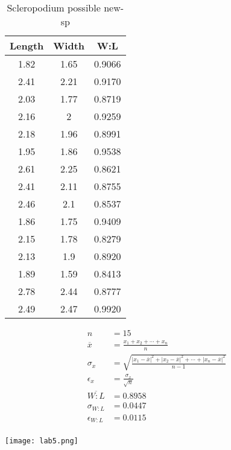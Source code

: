 \documentclass{article}
\begin{document}
\newpage
\begin{table}[h!]
  \begin{center}
    \caption{Scleropodium possible new-sp}
    \begin{tabular}{|c|c|c|}\hline
      Length & Width & W:L \\ \hline
      1.82 & 1.65 & 0.9066 \\ \hline
      2.41 & 2.21 & 0.9170 \\ \hline
      2.03 & 1.77 & 0.8719 \\ \hline
      2.16 & 2 & 0.9259 \\ \hline
      2.18 & 1.96 & 0.8991 \\ \hline
      1.95 & 1.86 & 0.9538 \\ \hline
      2.61 & 2.25 & 0.8621 \\ \hline
      2.41 & 2.11 & 0.8755 \\ \hline
      2.46 & 2.1 & 0.8537 \\ \hline
      1.86 & 1.75 & 0.9409 \\ \hline
      2.15 & 1.78 & 0.8279 \\ \hline
      2.13 & 1.9 & 0.8920 \\ \hline
      1.89 & 1.59 & 0.8413 \\ \hline
      2.78 & 2.44 & 0.8777 \\ \hline
      2.49 & 2.47 & 0.9920 \\ \hline
    \end{tabular}
  \end{center}
  \begin{center}
    \begin{equation}
      \begin{split}
        n &= 15 \\
        \overline{x} &= \frac{x_1 + x_2 + \cdots + x_n}{n} \\
        \sigma_{x} &= \sqrt{\frac{{|x_1 - \overline{x}|}^2 + {|x_2 - \overline{x}|}^2 + \cdots + {|x_n - \overline{x}|}^2}{n-1}} \\
        \epsilon_{x} &= \frac{\sigma_{x}}{\sqrt{n}} \\
        \overline{W:L} &= 0.8958 \\
        \sigma_{W:L} &= 0.0447 \\
        \epsilon_{W:L} &= 0.0115 \\
      \end{split}
    \end{equation}
  \end{center}
\end{table}
\newpage
\begin{center}
  \texttt{[image: lab5.png]}
\end{center}
\end{document}
